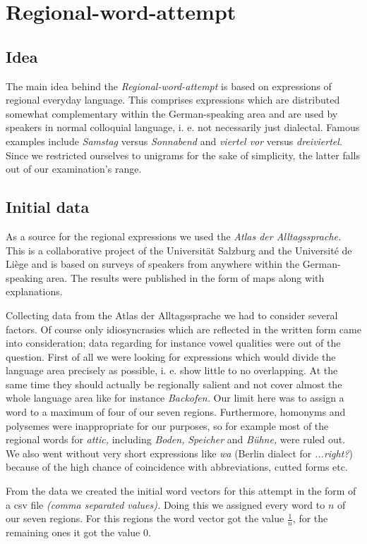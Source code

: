 \documentclass[./Main.tex]{subfiles}
\begin{document}
\section{Regional-word-attempt}
\subsection{Idea}
The main idea behind the \emph{Regional-word-attempt} is based on expressions of regional everyday language. This comprises expressions which are distributed somewhat complementary within the German-speaking area and are used by speakers in normal colloquial language, i. e. not necessarily just dialectal. Famous examples include \textit{Samstag} versus \textit{Sonnabend} and \textit{viertel vor} versus \textit{dreiviertel}. Since we restricted ourselves to unigrams for the sake of simplicity, the latter falls out of our examination's range.

\subsection{Initial data}
As a source for the regional expressions we used the \textit{Atlas der Alltagssprache.} This is a collaborative project of the Universität Salzburg and the Université de Liège and is based on surveys of speakers from anywhere within the German-speaking area. The results were published in the form of maps along with explanations.

Collecting data from the Atlas der Alltagssprache we had to consider several factors. Of course only idiosyncrasies which are reflected in the written form came into consideration; data regarding for instance vowel qualities were out of the question. First of all we were looking for expressions which would divide the language area precisely as possible, i. e. show little to no overlapping. At the same time they should actually be regionally salient and not cover almost the whole language area like for instance \textit{Backofen.} Our limit here was to assign a word to a maximum of four of our seven regions. Furthermore, homonyms and polysemes were inappropriate for our purposes, so for example most of the regional words for \textit{attic,} including \textit{Boden,} \textit{Speicher} and \textit{Bühne,} were ruled out. We also went without very short expressions like \textit{wa} (Berlin dialect for \textit{...right?}) because of the high chance of coincidence with abbreviations, cutted forms etc.

From the data we created the initial word vectors for this attempt in the form of a csv file \textit{(comma separated values).} Doing this we assigned every word to $n$ of our seven regions. For this regions the word vector got the value $\frac 1 n$, for the remaining ones it got the value 0.
\end{document}
